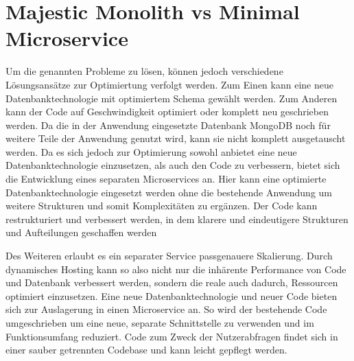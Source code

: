 \section{Majestic Monolith vs Minimal Microservice}
Um die genannten Probleme zu lösen, können jedoch verschiedene Lösungsansätze zur Optimiertung verfolgt werden. Zum Einen kann eine neue Datenbanktechnologie mit optimiertem Schema gewählt werden. Zum Anderen kann der Code auf Geschwindigkeit optimiert oder komplett neu geschrieben werden.
Da die in der Anwendung eingesetzte Datenbank MongoDB noch für weitere Teile der Anwendung genutzt wird, kann sie nicht komplett ausgetauscht werden. Da es sich jedoch zur Optimierung sowohl anbietet eine neue Datenbanktechnologie einzusetzen, als auch den Code zu verbessern, bietet sich die Entwicklung eines separaten Microservices an. Hier kann eine optimierte Datenbanktechnologie eingesetzt werden ohne die bestehende Anwendung um weitere Strukturen und somit Komplexitäten zu ergänzen. Der Code kann restrukturiert und verbessert werden, in dem klarere und eindeutigere Strukturen und Aufteilungen geschaffen werden

Des Weiteren erlaubt es ein separater Service passgenauere Skalierung. Durch dynamisches Hosting kann so also nicht nur die inhärente Performance von Code und Datenbank verbessert werden, sondern die reale auch dadurch, Ressourcen optimiert einzusetzen.
Eine neue Datenbanktechnologie und neuer Code bieten sich zur Auslagerung in einen Microservice an. So wird der bestehende Code umgeschrieben um eine neue, separate Schnittstelle zu verwenden und im Funktionsumfang reduziert. Code zum Zweck der Nutzerabfragen findet sich in einer sauber getrennten Codebase und kann leicht gepflegt werden.

